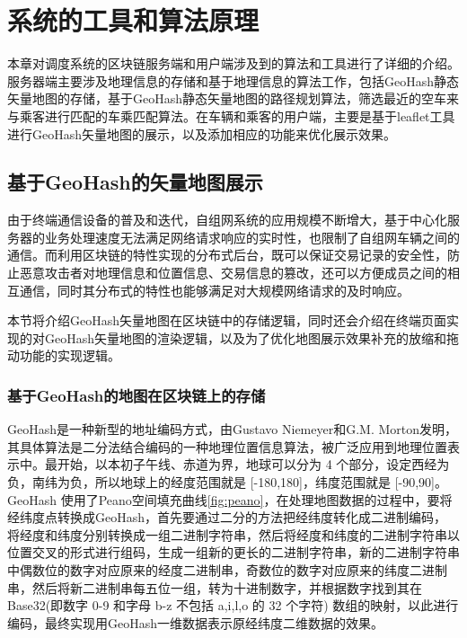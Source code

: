 \chapter{系统的工具和算法原理}

本章对调度系统的区块链服务端和用户端涉及到的算法和工具进行了详细的介绍。服务器端主要涉及地理信息的存储和基于地理信息的算法工作，包括GeoHash静态矢量地图的存储，基于GeoHash静态矢量地图的路径规划算法，筛选最近的空车来与乘客进行匹配的车乘匹配算法。在车辆和乘客的用户端，主要是基于leaflet工具进行GeoHash矢量地图的展示，以及添加相应的功能来优化展示效果。\par

\section{基于GeoHash的矢量地图展示}

由于终端通信设备的普及和迭代，自组网系统的应用规模不断增大，基于中心化服务器的业务处理速度无法满足网络请求响应的实时性，也限制了自组网车辆之间的通信。而利用区块链的特性实现的分布式后台，既可以保证交易记录的安全性，防止恶意攻击者对地理信息和位置信息、交易信息的篡改，还可以方便成员之间的相互通信，同时其分布式的特性也能够满足对大规模网络请求的及时响应。\par

本节将介绍GeoHash矢量地图在区块链中的存储逻辑，同时还会介绍在终端页面实现的对GeoHash矢量地图的渲染逻辑，以及为了优化地图展示效果补充的放缩和拖动功能的实现逻辑。\par

\subsection{基于GeoHash的地图在区块链上的存储}

GeoHash是一种新型的地址编码方式，由Gustavo Niemeyer和G.M. Morton发明，其具体算法是二分法结合编码的一种地理位置信息算法，被广泛应用到地理位置表示中。最开始，以本初子午线、赤道为界，地球可以分为 4 个部分，设定西经为负，南纬为负，所以地球上的经度范围就是 [-180,180]，纬度范围就是 [-90,90]。GeoHash 使用了Peano空间填充曲线\ref{fig:peano}，在处理地图数据的过程中，要将经纬度点转换成GeoHash，首先要通过二分的方法把经纬度转化成二进制编码，
将经度和纬度分别转换成一组二进制字符串，然后将经度和纬度的二进制字符串以位置交叉的形式进行组码，生成一组新的更长的二进制字符串，新的二进制字符串中偶数位的数字对应原来的经度二进制串，奇数位的数字对应原来的纬度二进制串，然后将新二进制串每五位一组，转为十进制数字，并根据数字找到其在Base32(即数字 0-9 和字母 b-z 不包括 a,i,l,o 的 32 个字符) 数组的映射，以此进行编码，最终实现用GeoHash一维数据表示原经纬度二维数据的效果。\par

